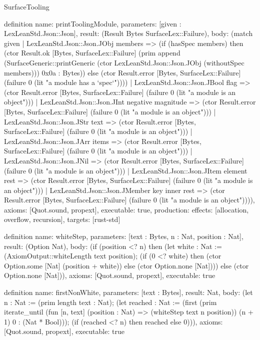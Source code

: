 \begin{lexlean}{SurfaceTooling}
\begin{semanticmodule}
definition{
  name: printToolingModule,
  parameters: [given : LexLeanStd.Json::Json],
  result: (Result Bytes SurfaceLex::Failure),
  body: (match given
    | LexLeanStd.Json::Json.JObj members => (if (hasSpec members) then (ctor Result.ok [Bytes, SurfaceLex::Failure] (prim append (SurfaceGeneric::printGeneric (ctor LexLeanStd.Json::Json.JObj (withoutSpec members))) 0x0a : Bytes)) else (ctor Result.error [Bytes, SurfaceLex::Failure] (failure 0 (lit "a module has a `spec`"))))
    | LexLeanStd.Json::Json.JBool flag => (ctor Result.error [Bytes, SurfaceLex::Failure] (failure 0 (lit "a module is an object")))
    | LexLeanStd.Json::Json.JInt negative magnitude => (ctor Result.error [Bytes, SurfaceLex::Failure] (failure 0 (lit "a module is an object")))
    | LexLeanStd.Json::Json.JStr text => (ctor Result.error [Bytes, SurfaceLex::Failure] (failure 0 (lit "a module is an object")))
    | LexLeanStd.Json::Json.JArr items => (ctor Result.error [Bytes, SurfaceLex::Failure] (failure 0 (lit "a module is an object")))
    | LexLeanStd.Json::Json.JNil => (ctor Result.error [Bytes, SurfaceLex::Failure] (failure 0 (lit "a module is an object")))
    | LexLeanStd.Json::Json.JItem element rest => (ctor Result.error [Bytes, SurfaceLex::Failure] (failure 0 (lit "a module is an object")))
    | LexLeanStd.Json::Json.JMember key inner rest => (ctor Result.error [Bytes, SurfaceLex::Failure] (failure 0 (lit "a module is an object")))),
  axioms: [Quot.sound, propext],
  executable: true,
  production: {effects: [allocation, overflow, recursion], targets: [rust-std]}
}

definition{
  name: whiteStep,
  parameters: [text : Bytes, n : Nat, position : Nat],
  result: (Option Nat),
  body: (if (position <? n) then (let white : Nat := (AxiomOutput::whiteLength text position); (if (0 <? white) then (ctor Option.some [Nat] (position + white)) else (ctor Option.none [Nat]))) else (ctor Option.none [Nat])),
  axioms: [Quot.sound, propext],
  executable: true
}

definition{
  name: firstNonWhite,
  parameters: [text : Bytes],
  result: Nat,
  body: (let n : Nat := (prim length text : Nat); (let reached : Nat := (first (prim iterate_until (fun [n, text] (position : Nat) => (whiteStep text n position)) (n + 1) 0 : (Nat * Bool))); (if (reached <? n) then reached else 0))),
  axioms: [Quot.sound, propext],
  executable: true
}


\end{semanticmodule}
\end{lexlean}

